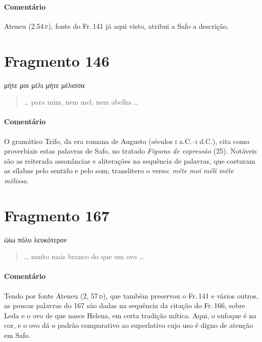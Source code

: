 \medskip

{\paragraph{Comentário} Ateneu (2.54\,\textsc{f}), fonte do Fr.\,141 já aqui visto, atribui a Safo a descrição.}


\pagebreak
\section{Fragmento 146}

\begin{gkverse}
μήτε μοι μέλι μήτε μέλισσα
\end{gkverse}

\begin{verse}
\ldots{} para mim, nem mel, nem abelha \ldots{}
\end{verse}

\medskip

{\paragraph{Comentário} O gramático Trifo, da era romana de Augusto (séculos \textsc{i} a.C.--\textsc{i} d.C.), 
cita como proverbiais estas palavras de Safo, no tratado \textit{Figuras de expressão} (25).
Notáveis são as reiterada assonâncias e aliterações na sequência de palavras, que costuram as sílabas pelo sentido e pelo som; translitero o verso: \textit{méte moi méli méte mélissa}.}


\section{Fragmento 167}

\begin{gkverse}
ὠίω πόλυ λευκότερον
\end{gkverse}

\begin{verse}
\ldots{} muito mais branco do que um ovo \ldots{}
\end{verse}

\medskip

{\paragraph{Comentário} Tendo por fonte Ateneu (2, 57\,\textsc{d}), que também preservou o Fr.\,141 e vários outros, as poucas palavras do 167 são dadas na sequência da citação do Fr.\,166, sobre Leda e o ovo de que nasce Helena, em certa tradição mítica. Aqui, o enfoque é na cor, e o ovo dá o padrão comparativo ao superlativo cujo uso é digno de atenção em Safo.}

